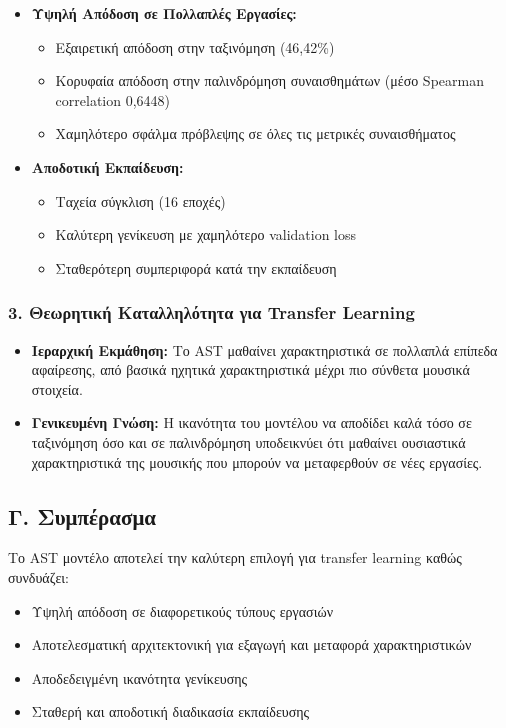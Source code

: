 \documentclass[a4paper,12pt]{article}
\begin{document}
\begin{itemize}
    \item \textbf{Υψηλή Απόδοση σε Πολλαπλές Εργασίες:}
    \begin{itemize}
        \item Εξαιρετική απόδοση στην ταξινόμηση (46,42\%)
        \item Κορυφαία απόδοση στην παλινδρόμηση συναισθημάτων (μέσο Spearman correlation 0,6448)
        \item Χαμηλότερο σφάλμα πρόβλεψης σε όλες τις μετρικές συναισθήματος
    \end{itemize}
    
    \item \textbf{Αποδοτική Εκπαίδευση:}
    \begin{itemize}
        \item Ταχεία σύγκλιση (16 εποχές)
        \item Καλύτερη γενίκευση με χαμηλότερο validation loss
        \item Σταθερότερη συμπεριφορά κατά την εκπαίδευση
    \end{itemize}
\end{itemize}

\subsubsection*{3. Θεωρητική Καταλληλότητα για Transfer Learning}

\begin{itemize}
    \item \textbf{Ιεραρχική Εκμάθηση:} Το AST μαθαίνει χαρακτηριστικά σε πολλαπλά επίπεδα αφαίρεσης, από βασικά ηχητικά χαρακτηριστικά μέχρι πιο σύνθετα μουσικά στοιχεία.

    \item \textbf{Γενικευμένη Γνώση:} Η ικανότητα του μοντέλου να αποδίδει καλά τόσο σε ταξινόμηση όσο και σε παλινδρόμηση υποδεικνύει ότι μαθαίνει ουσιαστικά χαρακτηριστικά της μουσικής που μπορούν να μεταφερθούν σε νέες εργασίες.
\end{itemize}

\subsection*{Γ. Συμπέρασμα}

Το AST μοντέλο αποτελεί την καλύτερη επιλογή για transfer learning καθώς συνδυάζει:
\begin{itemize}
    \item Υψηλή απόδοση σε διαφορετικούς τύπους εργασιών
    \item Αποτελεσματική αρχιτεκτονική για εξαγωγή και μεταφορά χαρακτηριστικών
    \item Αποδεδειγμένη ικανότητα γενίκευσης
    \item Σταθερή και αποδοτική διαδικασία εκπαίδευσης
\end{itemize}
\end{document}
